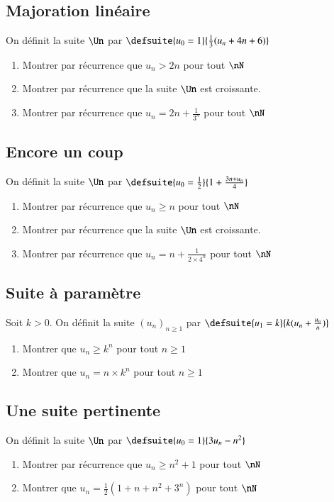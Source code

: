\documentclass[oneside,12pt]{article}          %
\begin{document}
\subsection{Majoration linéaire}
On définit la suite $\Un$ par $\defsuite{u_0=1}{\frac{1}{3}(u_n+4n+6)}$
\begin{enumerate}
    \item Montrer par récurrence que $u_n>2n$ pour tout $\nN$
    \item Montrer par récurrence que la suite $\Un$ est croissante.
    \item Montrer par récurrence que $u_n=2n+\frac{1}{3^n}$ pour tout $\nN$
\end{enumerate}



\subsection{Encore un coup}
On définit la suite $\Un$ par $\defsuite{u_0=\frac{1}{2}}{1+\frac{3n+u_n}{4}}$
\begin{enumerate}
    \item Montrer par récurrence que $u_n\geq n$ pour tout $\nN$
    \item Montrer par récurrence que la suite $\Un$ est croissante.
    \item Montrer par récurrence que $u_n=n+\frac{1}{2\times4^n}$ pour tout $\nN$
\end{enumerate}



\subsection{Suite à paramètre}
Soit $k>0$. On définit la suite $(u_n)_{n\geq1}$ par $\defsuite{u_1=k}{k(u_n+\frac{u_n}{n})}$
    \begin{enumerate}
        \item Montrer que $u_n\geq k^n$ pour tout $n\geq1$
        \item Montrer que $u_n=n\times k^n$ pour tout $n\geq1$
    \end{enumerate}



\subsection{Une suite pertinente}
On définit la suite $\Un$ par $\defsuite{u_0=1}{3u_n-n^2}$
\begin{enumerate}
	\item Montrer par récurrence que $u_n\geq n^2+1$ pour tout $\nN$
	\item Montrer que $u_n=\frac{1}{2}(1+n+n^2+3^n)$ pour tout $\nN$
\end{enumerate}
    
\end{document}
